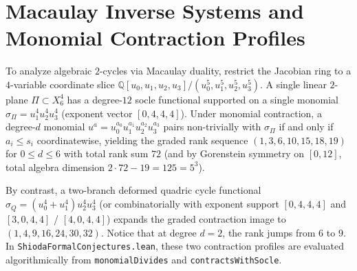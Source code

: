 \documentclass[11pt,a4paper]{article}
\begin{document}
\section{Macaulay Inverse Systems and Monomial Contraction Profiles}

To analyze algebraic $2$-cycles via Macaulay duality, restrict the Jacobian ring to a $4$-variable coordinate slice $\mathbb{Q}[u_0, u_1, u_2, u_3] / (u_0^5, u_1^5, u_2^5, u_3^5)$. A single linear $2$-plane $\Pi \subset X_6^4$ has a degree-$12$ socle functional supported on a single monomial $\sigma_\Pi = u_1^4 u_2^4 u_3^4$ (exponent vector $[0, 4, 4, 4]$). Under monomial contraction, a degree-$d$ monomial $u^a = u_0^{a_0} u_1^{a_1} u_2^{a_2} u_3^{a_3}$ pairs non-trivially with $\sigma_\Pi$ if and only if $a_i \le s_i$ coordinatewise, yielding the graded rank sequence $(1, 3, 6, 10, 15, 18, 19)$ for $0 \le d \le 6$ with total rank sum $72$ (and by Gorenstein symmetry on $[0, 12]$, total algebra dimension $2 \cdot 72 - 19 = 125 = 5^3$).

By contrast, a two-branch deformed quadric cycle functional $\sigma_Q = (u_0^4 + u_1^4) u_2^4 u_3^4$ (or combinatorially with exponent support $[0, 4, 4, 4]$ and $[3, 0, 4, 4]$ / $[4, 0, 4, 4]$) expands the graded contraction image to $(1, 4, 9, 16, 24, 30, 32)$. Notice that at degree $d = 2$, the rank jumps from $6$ to $9$. In \texttt{ShiodaFormalConjectures.lean}, these two contraction profiles are evaluated algorithmically from \texttt{monomialDivides} and \texttt{contractsWithSocle}.
\end{document}
